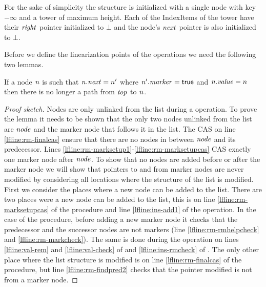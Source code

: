 For the sake of simplicity the structure is initialized with a single node with key $- \infty$ and a tower of maximum height.
Each of the IndexItems of the tower have their $\ms{right}$ pointer initialized to $\bot$ and the node's $\ms{next}$ pointer is also
initialized to $\bot$.


Before we define the linearization points of the operations we need the following two lemmas.

\begin{lemma}
\label{lemma:inlistlf}
If a node $\ms{n}$ is such that $\ms{n.next} = n'$ where $\ms{n'.marker} = \lit{true}$ and $\ms{n.value} = n$
then there is no longer a path from $\ms{top}$ to $\ms{n}$.
%
\end{lemma}
\begin{proof}[Proof sketch]
Nodes are only unlinked from the list during a  operation.
To prove the lemma it needs to be shown that the only two nodes unlinked from the list are $\ms{node}$ and the marker node that follows it in the list.
The CAS on line \ref{lfline:rm-finalcas} ensure that there
are no nodes in between $\ms{node}$ and its predecessor.
Lines \ref{lfline:rm-marksetup1}-\ref{lfline:rm-marksetupcas} CAS exactly one marker node after $\ms{node}$.
To show that no nodes are added before or after the marker node we will show that pointers to and from marker nodes are never modified
by considering all locations where the structure of the list is modified.
First we consider the places where a new node can be added to the list.
There are two places were a new node can be added to the list, this is on line \ref{lfline:rm-marksetupcas} of the  procedure
and line \ref{lfline:ins-add1} of the  operation.
In the case of the  procedure, before adding a new marker node
it checks that the predecessor and the successor nodes are not markers (line \ref{lfline:rm-rmhelpcheck} and \ref{lfline:rm-markcheck}).
The same is done during the  operation on lines \ref{lfline:val-rem} and \ref{lfline:val-check} of  and \ref{lfline:ins-rmcheck} of .
The only other place where the list structure is modified is on line \ref{lfline:rm-finalcas} of the 
 procedure, but
line \ref{lfline:rm-findpred2} checks that the pointer modified is not from a marker node.
\end{proof}



